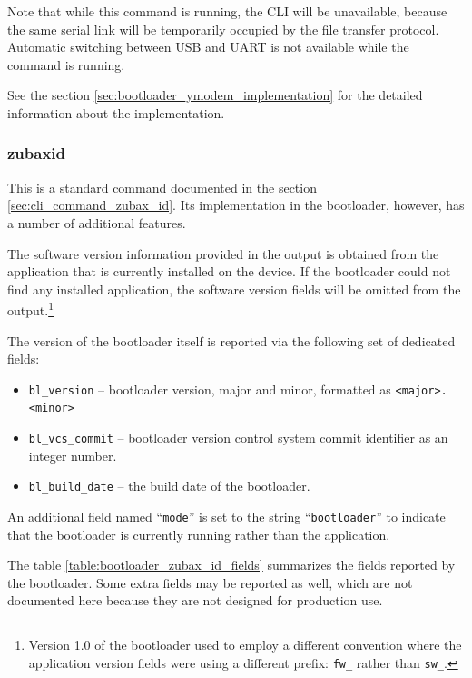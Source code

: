 \documentclass{zubaxdoc}
\begin{document}
Note that while this command is running, the CLI will be unavailable,
because the same serial link will be temporarily occupied by the file transfer protocol.
Automatic switching between USB and UART is not available while the command is running.

See the section \ref{sec:bootloader_ymodem_implementation} for the detailed information about the implementation.

\subsubsection{zubax\textunderscore{}id}

This is a standard command documented in the section \ref{sec:cli_command_zubax_id}.
Its implementation in the bootloader, however, has a number of additional features.

The software version information provided in the output is obtained from the application that is
currently installed on the device.
If the bootloader could not find any installed application,
the software version fields will be omitted from the
output.\footnote{Version 1.0 of the bootloader used to employ a different convention where the application
version fields were using a different prefix: \texttt{fw\_} rather than \texttt{sw\_}.}

The version of the bootloader itself is reported via the following set of dedicated fields:
\begin{itemize}
    \item \verb|bl_version| -- bootloader version, major and minor, formatted as \verb|<major>.<minor>|
    \item \verb|bl_vcs_commit| -- bootloader version control system commit identifier as an integer number.
    \item \verb|bl_build_date| -- the build date of the bootloader.
\end{itemize}

An additional field named ``\verb|mode|'' is set to the string ``\verb|bootloader|''
to indicate that the bootloader is currently running rather than the application.

The table \ref{table:bootloader_zubax_id_fields} summarizes the fields reported by the bootloader.
Some extra fields may be reported as well,
which are not documented here because they are not designed for production use.
\end{document}

